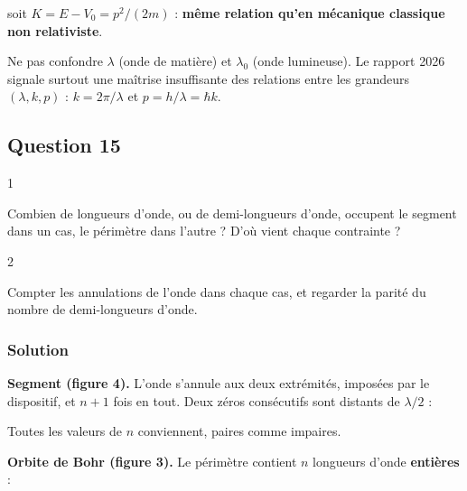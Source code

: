 \documentclass[11pt,a4paper]{article}
\newcommand{\equationajustee}[1]{%
  \sbox{\boiteequation}{$\displaystyle #1$}%
  \ifdim\wd\boiteequation>\linewidth
    \[\resizebox{\linewidth}{!}{\usebox{\boiteequation}}\]%
  \else
    \[#1\]%
  \fi}
\begin{document}
soit \(K=E-V_0=p^2/(2m)\) : \textbf{même relation qu'en mécanique classique non relativiste}.

\begin{piege}

Ne pas confondre \(\lambda\) (onde de matière) et \(\lambda_0\) (onde lumineuse). Le rapport 2026 signale surtout une maîtrise insuffisante des relations entre les grandeurs \((\lambda,k,p)\) : \(k=2\pi/\lambda\) et \(p=h/\lambda=\hbar k\).

\end{piege}

\hypertarget{question-15}{%
\subsection{Question 15}\label{question-15}}

\begin{indication}{1}

Combien de longueurs d'onde, ou de demi-longueurs d'onde, occupent le segment dans un cas, le périmètre dans l'autre ? D'où vient chaque contrainte ?

\end{indication}

\begin{indication}{2}

Compter les annulations de l'onde dans chaque cas, et regarder la parité du nombre de demi-longueurs d'onde.

\end{indication}

\hypertarget{solution-14}{%
\subsubsection{Solution}\label{solution-14}}

\textbf{Segment (figure 4).} L'onde s'annule aux deux extrémités, imposées par le dispositif, et \(n+1\) fois en tout. Deux zéros consécutifs sont distants de \(\lambda/2\) :

\equationajustee{\ell=n\,\frac{\lambda}{2},\ n\in\mathbb N^*.}

Toutes les valeurs de \(n\) conviennent, paires comme impaires.

\textbf{Orbite de Bohr (figure 3).} Le périmètre contient \(n\) longueurs d'onde \textbf{entières} :

\equationajustee{\begin{aligned}
2\pi r&=n\lambda\\
&=2n\,\frac{\lambda}{2}.
\end{aligned}}
\end{document}
